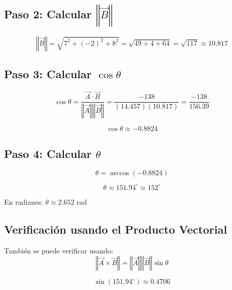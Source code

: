 \documentclass[12pt,letterpaper]{article}
\begin{document}
\subsection*{Paso 2: Calcular $\left\Vert \vec{B} \right\Vert$}

\begin{equation*}
\left\Vert \vec{B} \right\Vert = \sqrt{7^2 + (-2)^2 + 8^2} = \sqrt{49 + 4 + 64} = \sqrt{117} \approx \boxed{10.817}
\end{equation*}

\subsection*{Paso 3: Calcular $\cos\theta$}

\begin{equation*}
\cos\theta = \frac{\vec{A} \cdot \vec{B}}{\left\Vert \vec{A} \right\Vert \left\Vert \vec{B} \right\Vert} = \frac{-138}{(14.457)(10.817)} = \frac{-138}{156.39}
\end{equation*}

\begin{equation*}
\cos\theta \approx -0.8824
\end{equation*}

\subsection*{Paso 4: Calcular $\theta$}

\begin{equation*}
\theta = \arccos(-0.8824)
\end{equation*}

\begin{equation*}
\boxed{\theta \approx 151.94^\circ \approx 152^\circ}
\end{equation*}

En radianes: $\theta \approx 2.652$ rad

\subsection*{Verificaci\'on usando el Producto Vectorial}

Tambi\'en se puede verificar usando:
\begin{equation*}
\left\Vert \vec{A} \times \vec{B} \right\Vert = \left\Vert \vec{A} \right\Vert \left\Vert \vec{B} \right\Vert \sin\theta
\end{equation*}

\begin{equation*}
\sin(151.94^\circ) \approx 0.4706
\end{equation*}
\end{document}
